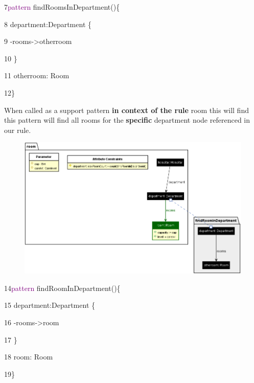 \clearpage


{

7\hspace{1cm}\textcolor{Purple}{pattern} findRoomsInDepartment()\{  

8\hspace{1.5cm} department:Department \{

9\hspace{2cm} -rooms->otherroom 

10\hspace{1.5cm} \} 

11\hspace{1.5cm} otherroom: Room 

12\hspace{1cm}\}\newline 

}

When called as a support pattern \textbf{in context of the rule} \textsf{room} this will find this pattern will find all rooms for the \textbf{specific} department node referenced in our rule.

\begin{figure}[h]
    \centering
    \includegraphics[scale = 0.45]{pictures/roomRule.png}
    \caption{}
    \label{findRooms}
\end{figure}

{

14\hspace{1cm}\textcolor{Purple}{pattern} findRoomInDepartment()\{  

15\hspace{1.5cm} department:Department \{ 

16\hspace{2cm} -rooms->room 

17\hspace{1.5cm} \} 

18\hspace{1.5cm} room: Room

19\hspace{1cm}\}\newline

}

